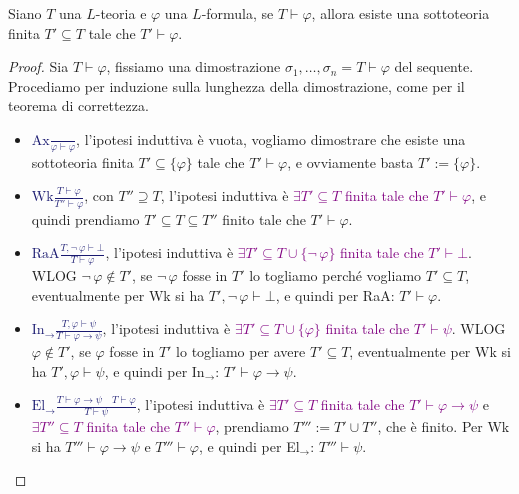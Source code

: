 \begin{theorem}
    Siano $T$ una $L$-teoria e $\varphi$ una $L$-formula, se $T \vdash \varphi$, allora esiste una sottoteoria finita $T' \subseteq T$ tale che $T' \vdash \varphi$.
\end{theorem}
\begin{proof}
    Sia $T \vdash \varphi$, fissiamo una dimostrazione $\sigma_1,\ldots,\sigma_n = T \vdash \varphi$ del sequente. Procediamo per induzione sulla lunghezza della dimostrazione,
    come per il teorema di correttezza.
    \begin{itemize}
        \item \textcolor{MidnightBlue}{$\displaystyle\text{Ax} \frac{}{\varphi \vdash \varphi}$}, l'ipotesi induttiva è vuota, vogliamo dimostrare che esiste una sottoteoria finita $T' \subseteq \{\varphi\}$ tale che $T' \vdash \varphi$, e ovviamente basta $T' := \{\varphi\}$.
        \item \textcolor{MidnightBlue}{$\displaystyle\text{Wk} \frac{T \vdash \varphi}{T'' \vdash \varphi}$}, con $T'' \supseteq T$, l'ipotesi induttiva è \textcolor{purple}{$\exists T' \subseteq T$ finita tale che $T' \vdash \varphi$}, e quindi prendiamo $T' \subseteq T \subseteq T''$ finito tale che $T' \vdash \varphi$.
        \item \textcolor{MidnightBlue}{$\displaystyle\text{RaA} \frac{T, \neg \,\varphi \vdash \bot}{T \vdash \varphi}$}, l'ipotesi induttiva è \textcolor{purple}{$\exists T' \subseteq T \cup \{\neg \,\varphi\}$ finita tale che $T' \vdash \bot$}. WLOG $\neg \, \varphi \not\in T'$, se $\neg \, \varphi$ fosse in $T'$ lo togliamo perché vogliamo $T' \subseteq T$, eventualmente per Wk si ha $T',\neg \,\varphi \vdash \bot$, e quindi per RaA: $T' \vdash \varphi$.
        \item \textcolor{MidnightBlue}{$\displaystyle\text{In}_\to \frac{T,\varphi \vdash \psi}{T \vdash \varphi \to \psi}$}, l'ipotesi induttiva è \textcolor{purple}{$\exists T' \subseteq T \cup \{\varphi\}$ finita tale che $T' \vdash \psi$}. WLOG $\varphi \not\in T'$, se $\varphi$ fosse in $T'$ lo togliamo per avere $T' \subseteq T$, eventualmente per Wk si ha $T',\varphi \vdash \psi$, e quindi per In$_\to$: $T' \vdash \varphi \to \psi$.
        \item \textcolor{MidnightBlue}{$\displaystyle\text{El}_\to \frac{T \vdash \varphi \to \psi\quad T \vdash \varphi}{T \vdash \psi}$}, l'ipotesi induttiva è \textcolor{purple}{$\exists T' \subseteq T$ finita tale che $T' \vdash \varphi \to \psi$} e \textcolor{purple}{$\exists T'' \subseteq T$ finita tale che $T'' \vdash \varphi$}, prendiamo $T''' := T' \cup T''$, che è finito. Per Wk si ha $T''' \vdash \varphi \to \psi$ e $T''' \vdash \varphi$, e quindi per El$_\to$: $T''' \vdash \psi$.

\end{itemize}
\end{proof}
